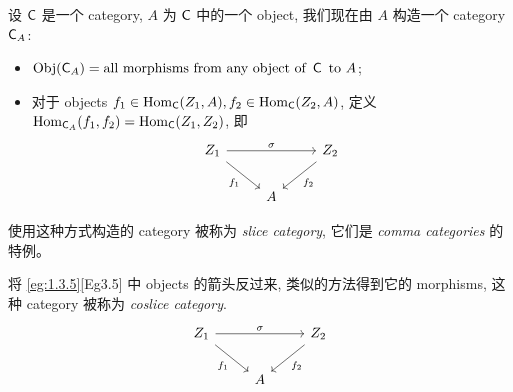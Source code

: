 \begin{eg}\label{eg:1.3.5}
    设 \(\operatorname{\mathsf{C}}\) 是一个 category, \(A\) 为 \(\operatorname{\mathsf{C}}\) 中的一个 object, 我们现在由 \(A\) 构造一个 category \(\operatorname{\mathsf{C}}_A\):
    \begin{itemize}
        \item \(\operatorname{Obj}(\operatorname{\mathsf{C}}_A) = \text{all morphisms from any object of } \operatorname{\mathsf{C}} \text{ to } A\);
        \item 对于 objects \(f_1 \in \operatorname{Hom}_{\operatorname{\mathsf{C}}}(Z_1, A), f_2 \in \operatorname{Hom}_{\operatorname{\mathsf{C}}}(Z_2, A)\), 定义 \(\operatorname{Hom}_{\operatorname{\mathsf{C}}_A}(f_1, f_2) = \operatorname{Hom}_{\operatorname{\mathsf{C}}}(Z_1, Z_2)\), 即
              \[\begin{tikzcd}
                      {Z_1} && {Z_2} \\
                      & A
                      \arrow["\sigma", from=1-1, to=1-3]
                      \arrow["{f_1}"', from=1-1, to=2-2]
                      \arrow["{f_2}", from=1-3, to=2-2]
                  \end{tikzcd}\]
    \end{itemize}
    \begin{definition}\label{def:slice_category}
        使用这种方式构造的 category 被称为 \emph{slice category}, 它们是 \emph{comma categories} 的特例。
    \end{definition}
\end{eg}

\begin{eg}\label{eg:1.3.7}
    将 \ref{eg:1.3.5}[Eg3.5] 中 objects 的箭头反过来, 类似的方法得到它的 morphisms, 这种 category 被称为 \emph{coslice category}.
    \[\begin{tikzcd}
            {Z_1} && {Z_2} \\
            & A
            \arrow["\sigma", from=1-1, to=1-3]
            \arrow["{f_1}"', from=1-1, to=2-2]
            \arrow["{f_2}", from=1-3, to=2-2]
        \end{tikzcd}\]
\end{eg}

